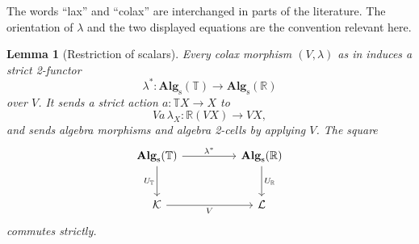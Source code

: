 \documentclass[11pt]{article}
\theoremstyle{plain}
\newtheorem{lemma}[theorem]{Lemma}
\theoremstyle{definition}
\theoremstyle{remark}
\newcommand{\Alg}{\mathbf{Alg}_{\mathrm{s}}}
\numberwithin{equation}{section}
\begin{document}
The words ``lax'' and ``colax'' are interchanged in parts of the
literature.  The orientation of $\lambda$ and the two displayed
equations are the convention relevant here.

\begin{lemma}[Restriction of scalars]\label{lem:restriction-scalars}
Every colax morphism $(V,\lambda)$ as in
 induces a strict 2-functor
\begin{equation*}
  \lambda^{*}\colon\Alg(\mathbb T)\longrightarrow\Alg(\mathbb R)
\end{equation*}
over $V$.  It sends a strict action
$a\colon\mathbb T X\to X$ to
\begin{equation}
  Va\,\lambda_X\colon\mathbb R(VX)\longrightarrow VX,
  \label{eq:restricted-action}
\end{equation}
and sends algebra morphisms and algebra 2-cells by applying $V$.
The square
\begin{equation*}
\begin{tikzcd}[column sep=huge,row sep=large]
\Alg(\mathbb T) \arrow[r,"\lambda^{*}"]
  \arrow[d,"U_{\mathbb T}"']
  & \Alg(\mathbb R) \arrow[d,"U_{\mathbb R}"] \\
\mathcal K \arrow[r,"V"'] & \mathcal L
\end{tikzcd}
\end{equation*}
commutes strictly.
\end{lemma}
\end{document}
